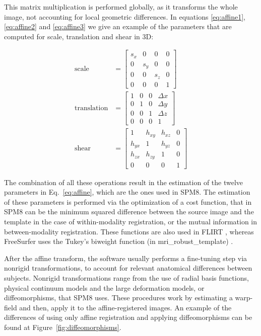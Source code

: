 This matrix multiplication is performed globally, as it transforms the whole image, not accounting for local geometric differences. In equations \ref{eq:affine1}, \ref{eq:affine2} and \ref{eq:affine3} we give an example of the parameters that are computed for scale, translation and shear in 3D:

\begin{align}
\label{eq:affine1}
	\text{scale} &= 
	\left[\begin{matrix}
		 s_x  &0 & 0 & 0\\
		0 &s_y &0 &0\\
		0 &0 &s_z &0\\
		0 &0 &0 &1		
	\end{matrix}
	\right]\\
	\label{eq:affine2}
	\text{translation} &= 
	\left[
	\begin{matrix}
	1  &0 & 0 & \Delta x\\
	0 &1 &0 &\Delta y\\
	0 &0 &1 &\Delta z\\
	0 &0 &0 &1		
	\end{matrix}
	\right] \\
	\label{eq:affine3}
	\text{shear} &= 
	\left[\begin{matrix}
	1  &h_{xy}& h_{xz} & 0\\
	h_{yx} &1 &h_{yz} &0\\
	h_{zx} &h_{zy} &1 &0\\
	0 &0 &0 &1		
	\end{matrix}
	\right]
\end{align}

The combination of all these operations result in the estimation of the twelve parameters in Eq.~\ref{eq:affine}, which are the ones used in \ac{SPM8}. The estimation of these parameters is performed via the optimization of a cost function, that in \ac{SPM8} can be the minimum squared difference between the source image and the template \cite{spm_book} in the case of within-modality registration, or the mutual information in between-modality registration. These functions are also used in FLIRT \cite{Jenkinson2001}, whereas FreeSurfer uses the Tukey's biweight function (in {\ttfamily mri\_robust\_template}) \cite{Reuter2012}.

After the affine transform, the software usually performs a fine-tuning step via nonrigid transformations, to account for relevant a\-na\-to\-mi\-cal differences between subjects. Nonrigid transformations range from the use of radial basis functions, physical continuum models and the large deformation models, or diffeomorphisms, that \ac{SPM8} uses. These procedures work by estimating a warp-field and then, apply it to the affine-registered images. An example of the differences of using only affine registration and applying diffeomorphisms can be found at Figure~\ref{fig:diffeomorphisms}.

